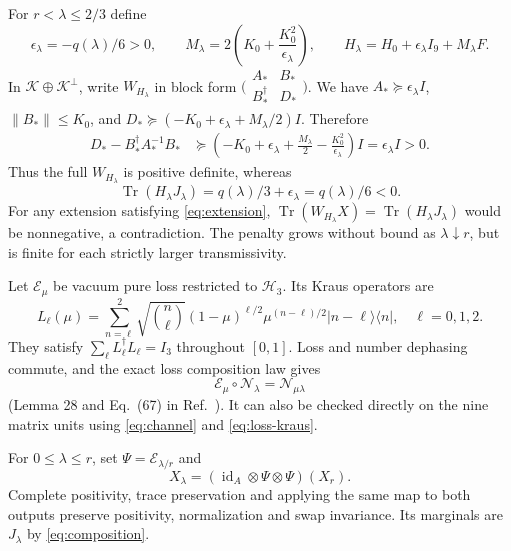 \documentclass[11pt]{article}
\newcommand{\ket}[1]{\lvert #1\rangle}
\newcommand{\bra}[1]{\langle #1\rvert}
\newcommand{\Tr}{\operatorname{Tr}}
\newcommand{\id}{\operatorname{id}}
\newcommand{\N}{\mathcal N}
\newcommand{\E}{\mathcal E}
\newcommand{\K}{\mathcal K}
\begin{document}
For $r<\lambda\leq2/3$ define
\begin{equation}\label{eq:full-H}
\epsilon_\lambda=-q(\lambda)/6>0,\qquad
M_\lambda=2\left(K_0+\frac{K_0^2}{\epsilon_\lambda}\right),\qquad
H_\lambda=H_0+\epsilon_\lambda I_9+M_\lambda F.
\end{equation}
In $\K\oplus\K^\perp$, write $W_{H_\lambda}$ in block form
$\bigl(\begin{smallmatrix}A_*&B_*\\B_*^\dagger&D_*\end{smallmatrix}\bigr)$.
We have $A_*\succeq\epsilon_\lambda I$, $\lVert B_*\rVert\leq K_0$,
and $D_*\succeq(-K_0+\epsilon_\lambda+M_\lambda/2)I$.
Therefore
\begin{equation}\label{eq:schur}
\begin{split}
D_*-B_*^\dagger A_*^{-1}B_*
&\succeq\left(-K_0+\epsilon_\lambda+\frac{M_\lambda}{2}
-\frac{K_0^2}{\epsilon_\lambda}\right)I
=\epsilon_\lambda I>0.
\end{split}
\end{equation}
Thus the full $W_{H_\lambda}$ is positive definite, whereas
\begin{equation}\label{eq:negative}
\Tr(H_\lambda J_\lambda)=q(\lambda)/3+\epsilon_\lambda
=q(\lambda)/6<0.
\end{equation}
For any extension satisfying \eqref{eq:extension},
$\Tr(W_{H_\lambda}X)=\Tr(H_\lambda J_\lambda)$ would be nonnegative,
a contradiction. The penalty grows without bound as $\lambda\downarrow r$,
but is finite for each strictly larger transmissivity.

Let $\E_\mu$ be vacuum pure loss restricted to $\mathcal H_3$.
Its Kraus operators are
\begin{equation}\label{eq:loss-kraus}
L_\ell(\mu)=\sum_{n=\ell}^2\sqrt{\binom n\ell}
(1-\mu)^{\ell/2}\mu^{(n-\ell)/2}\ket{n-\ell}\bra n,
\quad\ell=0,1,2.
\end{equation}
They satisfy $\sum_\ell L_\ell^\dagger L_\ell=I_3$ throughout $[0,1]$.
Loss and number dephasing commute, and the exact loss composition law gives
\begin{equation}\label{eq:composition}
\E_\mu\circ\N_\lambda=\N_{\mu\lambda}
\end{equation}
(Lemma 28 and Eq.~(67) in Ref.~\cite{Mele2024}). It can also be checked
directly on the nine matrix units using \eqref{eq:channel} and
\eqref{eq:loss-kraus}.

For $0\leq\lambda\leq r$, set $\Psi=\E_{\lambda/r}$ and
\begin{equation}\label{eq:below}
X_\lambda=(\id_A\otimes\Psi\otimes\Psi)(X_r).
\end{equation}
Complete positivity, trace preservation and applying the same map to both
outputs preserve positivity, normalization and swap invariance. Its marginals
are $J_\lambda$ by \eqref{eq:composition}.
\end{document}

